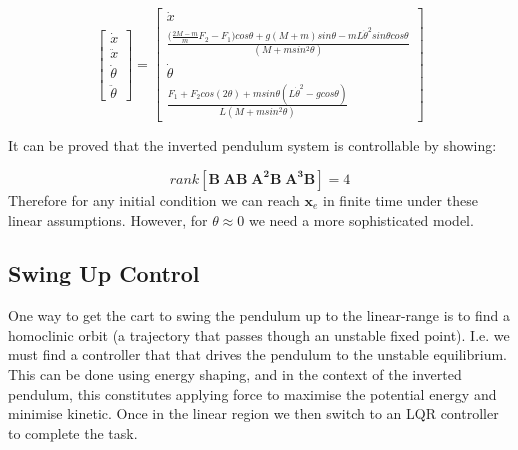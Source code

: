 \documentclass[../main.tex]{subfiles}
\begin{document}
\begin{equation}
\begin{bmatrix} \dot{x} \\ \ddot{x} \\ \dot{\theta} \\ \ddot{\theta} \end{bmatrix}  =
\begin{bmatrix} \dot{x} \\ \frac{\big(\frac{2M-m}{m}F_2-F_1\big)cos\theta + g(M+m)sin\theta - mL\dot{\theta}^2 sin\theta cos\theta}{(M + m sin^2\theta)} \\ \dot{\theta} \\ \frac{F_1 + F_2cos(2\theta)+ msin\theta(L\dot{\theta}^2-g cos\theta)}{L(M+m sin^2\theta)} \end{bmatrix} 
\end{equation}


It can be proved that the inverted pendulum system is controllable by showing:

\begin{equation}
    rank[\boldsymbol{B} \; \boldsymbol{AB} \; \boldsymbol{A^2B} \; \boldsymbol{A^3B}] = 4
\end{equation}
Therefore for any initial condition we can reach $\boldsymbol{x}_e$ in finite time under these linear assumptions.
However, for $\theta \approx 0$ we need a more sophisticated model.

\subsection{Swing Up Control}

One way to get the cart to swing the pendulum up to the linear-range is to find a homoclinic orbit (a trajectory that passes though an unstable fixed point). I.e. we must find a controller that that drives the pendulum to the unstable equilibrium. This can be done using energy shaping, and in the context of the inverted pendulum, this constitutes applying force to maximise the potential energy and minimise kinetic. Once in the linear region we then switch to an LQR controller to complete the task.
\end{document}
